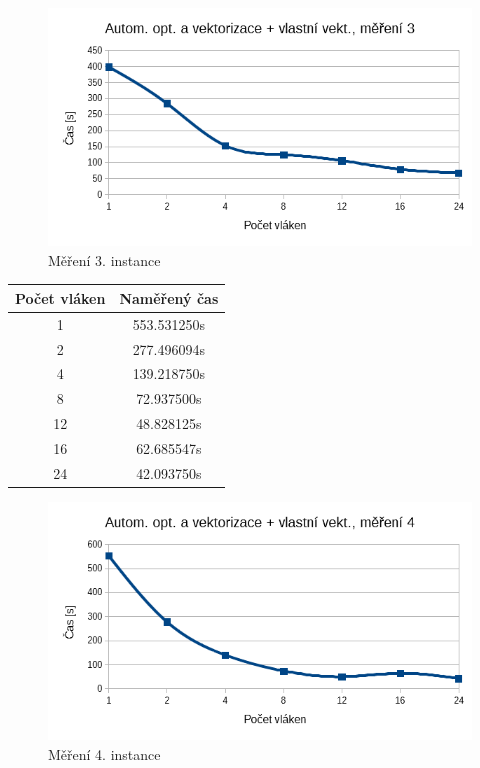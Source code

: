 \documentclass[12pt]{article}
\begin{document}
\begin{figure}[H]
  \begin{center}
      \includegraphics[width=12cm]{images/ssef3.png}	
    \caption{Měření 3. instance} 
  \end{center}
\end{figure}
%
%
\begin{center}
\begin{tabular}{ c | c }
\textbf{Počet vláken} & \textbf{Naměřený čas} \\ \hline \hline 
1 & 553.531250s \\ \hline
2 & 277.496094s \\ \hline
4 & 139.218750s \\ \hline
8 & 72.937500s \\ \hline
12 & 48.828125s \\ \hline
16 & 62.685547s \\ \hline
24 & 42.093750s \\ \hline
\end{tabular}
\end{center}

\begin{figure}[H]
  \begin{center}
      \includegraphics[width=12cm]{images/ssef4.png}	
    \caption{Měření 4. instance} 
  \end{center}
\end{figure}
\end{document}
